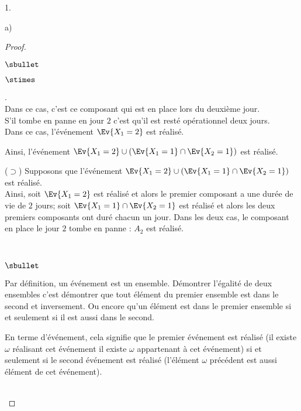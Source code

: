 \documentclass[11pt]{article}%
\begin{document}
\begin{noliste}{1.}
\begin{noliste}{a)}
\begin{proof}
\begin{liste}{$\sbullet$}
\begin{noliste}{$\stimes$}
          \item {}.\\
            Dans ce cas, c'est ce composant qui est en place lors du
            deuxième jour.\\
            S'il tombe en panne en jour $2$ c'est qu'il est resté
            opérationnel deux jours.\\[.1cm]
            Dans ce cas, l'événement $\Ev{X_1=2}$ est réalisé.
          \end{noliste}
          Ainsi, l'événement $\Ev{X_1=2} \cup \left(\Ev{X_1=1} \cap
            \Ev{X_2=1} \right)$ est réalisé.
        \item[($\supset$)] Supposons que l'événement $\Ev{X_1=2} \cup
          \left(\Ev{X_1=1} \cap \Ev{X_2=1} \right)$ est réalisé.\\
          Ainsi, soit $\Ev{X_1 = 2}$ est réalisé et alors le premier
          composant a une durée de vie de $2$ jours; soit $\Ev{X_1=1}
          \cap \Ev{X_2=1}$ est réalisé et alors les deux premiers
          composants ont duré chacun un jour. Dans les deux cas, le
          composant en place le jour $2$ tombe en panne : $A_2$ est
          réalisé.
        \end{liste}
        ~\\[-1.1cm]
        \begin{remarkL}{.98}%
          \begin{noliste}{$\sbullet$}
          \item Par définition, un événement est un
            ensemble. Démontrer l'égalité de deux ensembles c'est
            démontrer que tout élément du premier ensemble est dans le
            second et inversement. Ou encore qu'un élément est dans le
            premier ensemble si et seulement si il est aussi dans le
            second.
          \item En terme d'événement, cela signifie que le premier
            événement est réalisé (il existe $\omega$ réalisant cet
            événement \ie il existe $\omega$ appartenant à cet
            événement) si et seulement si le second événement est
            réalisé (l'élément $\omega$ précédent est aussi élément de
            cet événement).
          \end{noliste}          
        \end{remarkL}~\\[-1.4cm]
      \end{proof}


\end{noliste}
\end{noliste}
\end{document}
